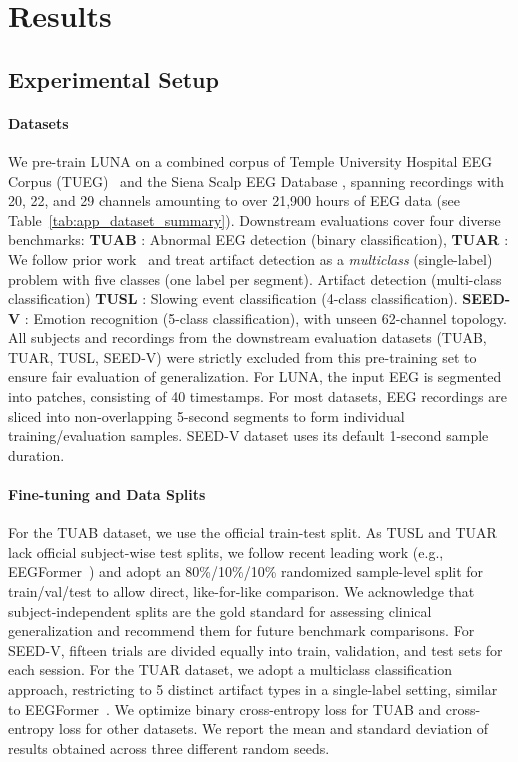 \section{Results}
\label{sec:results}
\vspace{-2mm}
\subsection{Experimental Setup}
\label{subsec:setup}
\paragraph{Datasets} 

We pre-train LUNA on a combined corpus of Temple University Hospital EEG Corpus (TUEG)~\citep{obeid2016temple} and the Siena Scalp EEG Database \citep{detti2020siena}, spanning recordings with 20, 22, and 29 channels amounting to over 21,900 hours of EEG data (see Table~\ref{tab:app_dataset_summary}). Downstream evaluations cover four diverse benchmarks: \textbf{TUAB} \citep{obeid2016temple}: Abnormal EEG detection (binary classification), \textbf{TUAR} \citep{obeid2016temple}: We follow prior work~\citep{ingolfsson2022} and treat artifact detection as a \emph{multiclass} (single-label) problem with five classes (one label per segment). Artifact detection (multi-class classification) \textbf{TUSL} \citep{obeid2016temple}: Slowing event classification (4-class classification). \textbf{SEED-V} \citep{liu2021comparing}: Emotion recognition (5-class classification), with unseen 62-channel topology. All subjects and recordings from the downstream evaluation datasets (TUAB, TUAR, TUSL, SEED-V) were strictly excluded from this pre-training set to ensure fair evaluation of generalization. For LUNA, the input EEG is segmented into patches, consisting of 40 timestamps. For most datasets, EEG recordings are sliced into non-overlapping 5-second segments to form individual training/evaluation samples. SEED-V dataset uses its default 1-second sample duration.

\paragraph{Fine-tuning and Data Splits}
For the TUAB dataset, we use the official train-test split. As TUSL and TUAR lack official subject-wise test splits, we follow recent leading work (e.g., EEGFormer~\citep{chen2024eegformer}) and adopt an 80\%/10\%/10\% randomized sample-level split for train/val/test to allow direct, like-for-like comparison. We acknowledge that subject-independent splits are the gold standard for assessing clinical generalization and recommend them for future benchmark comparisons. For SEED-V, fifteen trials are divided equally into train, validation, and test sets for each session. For the TUAR dataset, we adopt a multiclass classification approach, restricting to 5 distinct artifact types in a single-label setting, similar to EEGFormer~\citep{chen2024eegformer}. We optimize binary cross-entropy loss for TUAB and cross-entropy loss for other datasets. We report the mean and standard deviation of results obtained across three different random seeds.

